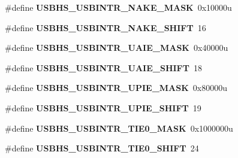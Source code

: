 \begin{DoxyCompactItemize}
\item 
\hypertarget{group___u_s_b_h_s___register___masks_ga9df4e3ae1cbab65f30dcbbfa3d7f7a1c}{}\#define {\bfseries U\+S\+B\+H\+S\+\_\+\+U\+S\+B\+I\+N\+T\+R\+\_\+\+N\+A\+K\+E\+\_\+\+M\+A\+S\+K}~0x10000u\label{group___u_s_b_h_s___register___masks_ga9df4e3ae1cbab65f30dcbbfa3d7f7a1c}

\item 
\hypertarget{group___u_s_b_h_s___register___masks_ga2bbf915f3f137d2accb08528b7072ba4}{}\#define {\bfseries U\+S\+B\+H\+S\+\_\+\+U\+S\+B\+I\+N\+T\+R\+\_\+\+N\+A\+K\+E\+\_\+\+S\+H\+I\+F\+T}~16\label{group___u_s_b_h_s___register___masks_ga2bbf915f3f137d2accb08528b7072ba4}

\item 
\hypertarget{group___u_s_b_h_s___register___masks_ga692753f4dfe0443e9d10377fadb3072f}{}\#define {\bfseries U\+S\+B\+H\+S\+\_\+\+U\+S\+B\+I\+N\+T\+R\+\_\+\+U\+A\+I\+E\+\_\+\+M\+A\+S\+K}~0x40000u\label{group___u_s_b_h_s___register___masks_ga692753f4dfe0443e9d10377fadb3072f}

\item 
\hypertarget{group___u_s_b_h_s___register___masks_ga945e8b59015a157e626afc6ffce7c14d}{}\#define {\bfseries U\+S\+B\+H\+S\+\_\+\+U\+S\+B\+I\+N\+T\+R\+\_\+\+U\+A\+I\+E\+\_\+\+S\+H\+I\+F\+T}~18\label{group___u_s_b_h_s___register___masks_ga945e8b59015a157e626afc6ffce7c14d}

\item 
\hypertarget{group___u_s_b_h_s___register___masks_ga33e6e2bf4b06b0b5d1c81710a71fa768}{}\#define {\bfseries U\+S\+B\+H\+S\+\_\+\+U\+S\+B\+I\+N\+T\+R\+\_\+\+U\+P\+I\+E\+\_\+\+M\+A\+S\+K}~0x80000u\label{group___u_s_b_h_s___register___masks_ga33e6e2bf4b06b0b5d1c81710a71fa768}

\item 
\hypertarget{group___u_s_b_h_s___register___masks_gacf2828265b2efb77490b7f406a8bc52f}{}\#define {\bfseries U\+S\+B\+H\+S\+\_\+\+U\+S\+B\+I\+N\+T\+R\+\_\+\+U\+P\+I\+E\+\_\+\+S\+H\+I\+F\+T}~19\label{group___u_s_b_h_s___register___masks_gacf2828265b2efb77490b7f406a8bc52f}

\item 
\hypertarget{group___u_s_b_h_s___register___masks_ga07f0cd280f98f8801bd1a4d81e727c34}{}\#define {\bfseries U\+S\+B\+H\+S\+\_\+\+U\+S\+B\+I\+N\+T\+R\+\_\+\+T\+I\+E0\+\_\+\+M\+A\+S\+K}~0x1000000u\label{group___u_s_b_h_s___register___masks_ga07f0cd280f98f8801bd1a4d81e727c34}

\item 
\hypertarget{group___u_s_b_h_s___register___masks_ga0e5e7cdfe0e25accda7bc9ded622e80f}{}\#define {\bfseries U\+S\+B\+H\+S\+\_\+\+U\+S\+B\+I\+N\+T\+R\+\_\+\+T\+I\+E0\+\_\+\+S\+H\+I\+F\+T}~24\label{group___u_s_b_h_s___register___masks_ga0e5e7cdfe0e25accda7bc9ded622e80f}


\end{DoxyCompactItemize}
